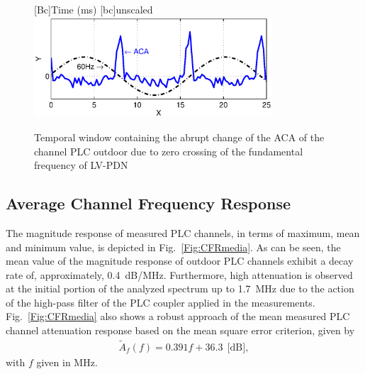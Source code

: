 \documentclass[journal]{IEEEtran}
\newcommand{\tamfig}{3.5in}    %
\begin{document}
	\begin{figure}[!htp]
		\begin{centering}
			[Bc]{Time (ms)}    
			[bc]{unscaled}
			\includegraphics[width=\tamfig]{Figuras/SenoJanelaZero.eps}
			\caption{Temporal window containing the abrupt change of the ACA of the channel PLC outdoor due to zero crossing of the fundamental frequency of LV-PDN}
			\label{Fig:SenoJanelaZero}
		\end{centering}
	\end{figure}
	
	\subsection{Average Channel Frequency Response}
	The magnitude response of measured PLC channels, in terms of maximum, mean and minimum value, is depicted in Fig.~\ref{Fig:CFRmedia}. As can be seen, the mean value of the magnitude response of outdoor PLC channels exhibit a decay rate of, approximately, 0.4~dB/MHz. Furthermore, high attenuation is observed at the initial portion of the analyzed spectrum up to 1.7~MHz due to the action of the high-pass filter of the PLC coupler applied in the measurements. Fig.~\ref{Fig:CFRmedia} also shows a robust approach of the mean measured PLC channel attenuation response based on the mean square error criterion, given by
	\begin{eqnarray} \label{eq-CFRmedia}
	\widetilde{A}_f(f) = 0.391f+36.3 \   \  \mbox{[dB]},   
	\end{eqnarray}
	with $f$ given in MHz.
	
\end{document}
